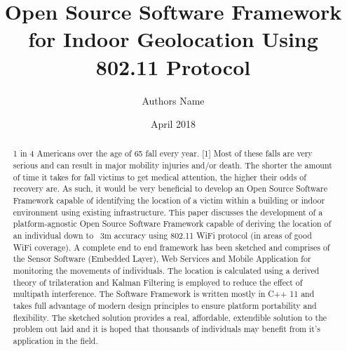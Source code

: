\documentclass[conference]{IEEEtran}
\title{Open Source Software Framework for Indoor Geolocation Using 802.11 Protocol}
\author{Authors Name }
\date{April 2018}
\begin{document}
\maketitle
\begin{abstract}
	1 in 4 Americans over the age of 65 fall every year. [1] Most of these falls are very serious and can result in major mobility injuries and/or death. The shorter the amount of time it takes for fall victims to get medical attention, the higher their odds of recovery are. As such, it would be very beneficial to develop an Open Source Software Framework capable of identifying the location of a victim within a building or indoor environment using existing infrastructure. 
\newline This paper discusses the development of a platform-agnostic Open Source Software Framework capable of deriving the location of an individual down to ~3m accuracy using 802.11 WiFi protocol (in areas of good WiFi coverage). A complete end to end framework has been sketched and comprises of the Sensor Software (Embedded Layer), Web Services and Mobile Application for monitoring the movements of individuals. The location is calculated using a derived theory of trilateration and Kalman Filtering is employed to reduce the effect of multipath interference. The Software Framework is written mostly in C++ 11 and takes full advantage of modern design principles to ensure platform portability and flexibility. The sketched solution provides a real, affordable, extendible solution to the problem out laid and it is hoped that thousands of individuals may benefit from it's application in the field.
\end{abstract}
\end{document}
